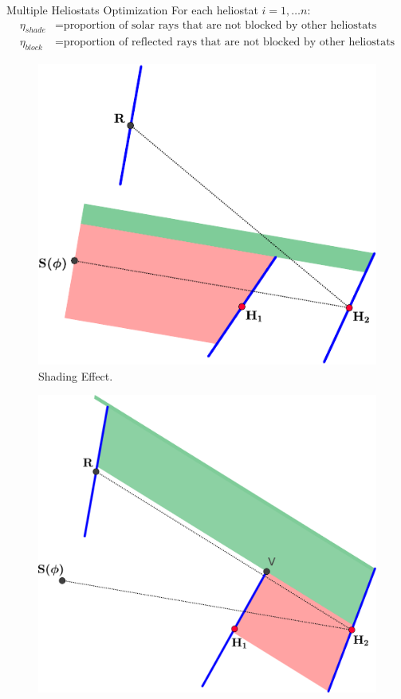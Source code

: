 \documentclass[10pt, xcolor={dvipsnames}]{beamer}
\begin{document}
\begin{frame}{Multiple Heliostats Optimization}
For each heliostat $i=1,\dots n$:
\begin{align}
\eta_{shade}&=\text{proportion of solar rays that are not blocked by other heliostats} \\[.5em]
\eta_{block}&=\text{proportion of reflected rays that are not blocked by other heliostats}
\end{align}


\begin{minipage}[t]{0.5\textwidth}
\begin{center}
\begin{figure}
\includegraphics[width=.9\textwidth]{../figures/shading-crop.pdf}
\caption{Shading Effect.}
\end{figure}
\end{center}
\end{minipage}%
\begin{minipage}[t]{0.5\textwidth}
\begin{center}
\begin{figure}
\includegraphics[width=.95\textwidth]{../figures/blocking-crop.pdf}

\end{figure}
\end{center}
\end{minipage}
\end{frame}
\end{document}
